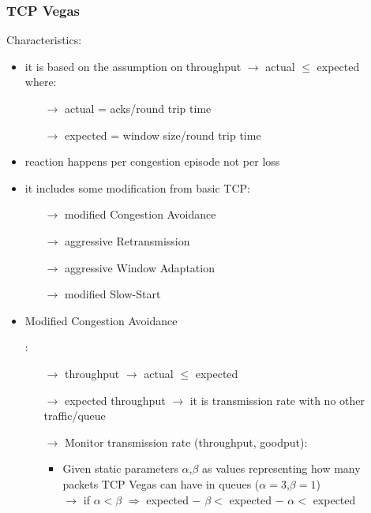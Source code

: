 \subsubsection{TCP Vegas}
\label{TCP-vegas-subsubsection}
Characteristics:
\begin{itemize}
    \item it is based on the assumption on throughput $\rightarrow$ actual $\leq$ expected\\
    where:
    \begin{itemize}
        \item[$\rightarrow$] actual = acks/round trip time
        \item[$\rightarrow$] expected = window size/round trip time
    \end{itemize} 
    \item reaction happens per congestion episode not per loss
    \item it includes some modification from basic TCP:
    \begin{itemize}
        \item[$\rightarrow$] modified Congestion Avoidance
        \item[$\rightarrow$] aggressive Retransmission
        \item[$\rightarrow$] aggressive Window Adaptation
        \item[$\rightarrow$] modified Slow-Start
    \end{itemize}
    \item \hypertarget{congestion-avoidance-paragraph}{Modified Congestion Avoidance}:
    \begin{itemize}
        \item[$\rightarrow$] throughput $\rightarrow$ actual $\leq$ expected
        \item[$\rightarrow$] expected throughput $\rightarrow$ it is transmission rate with no other traffic/queue
        \item[$\rightarrow$] Monitor transmission rate (throughput, goodput):
        \begin{itemize}
            \item Given static parameters $\alpha$,$\beta$ as values representing how many\\packets TCP Vegas can have in queues
            ($\alpha = 3$,$\beta = 1$)\\[0.15cm]
            $\rightarrow$ if $\alpha < \beta$
                $\Rightarrow$ expected $-$ $\beta <$ expected $-$ $\alpha <$ expected\\[0.15cm]

\end{itemize}
\end{itemize}
\end{itemize}
